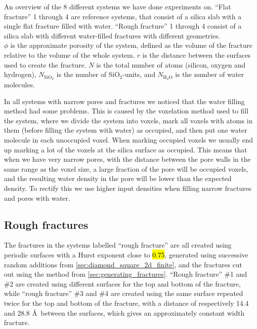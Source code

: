 \begin{table}[htpb]
{%
        An overview of the 8 different systems we have done experiments on. ``Flat fracture'' 1 through 4 are reference systems, that consist of a silica slab with a single flat fracture filled with water. ``Rough fracture'' 1 through 4 consist of a silica slab with different water-filled fractures with different geometries.%
        \\%
%
        $\phi$ is the approximate porosity of the system, defined as the volume of the fracture relative to the volume of the whole system. $r$ is the distance between the surfaces used to create the fracture. $N$ is the total number of atoms (silicon, oxygen and hydrogen), $N_\text{SiO$_2$}$ is the number of SiO$_2$-units, and $N_\text{H$_2$O}$ is the number of water molecules. %
%
        \label{tab:systems}%
    }
\end{table}%

In all systems with narrow pores and fractures we noticed that the water filling method had some problems. This is caused by the voxelation method used to fill the system, where we divide the system into voxels, mark all voxels with atoms in them (before filling the system with water) as occupied, and then put one water molecule in each unoccupied voxel. When marking occupied voxels we usually end up marking a lot of the voxels at the silica surface as occupied. This means that when we have very narrow pores, with the distance between the pore walls in the same range as the voxel size, a large fraction of the pore will be occupied voxels, and the resulting water density in the pore will be lower than the expected density. To rectify this we use higher input densities when filling narrow fractures and pores with water.


\subsection*{Rough fractures}
The fractures in the systems labelled ``rough fracture'' are all created using periodic surfaces with a Hurst exponent close to \hl{0.75}, generated using successive random additions from \cref{sec:diamond_square_2d_finite}, and the fractures cut out using the method from \cref{sec:generating_fractures}. ``Rough fracture'' \#1 and \#2 are created using different surfaces for the top and bottom of the fracture, while ``rough fracture'' \#3 and \#4 are created using the same surface repeated twice for the top and bottom of the fracture, with a distance of respectively 14.4 and 28.8 \AA\ between the surfaces, which gives an approximately constant width fracture. 

